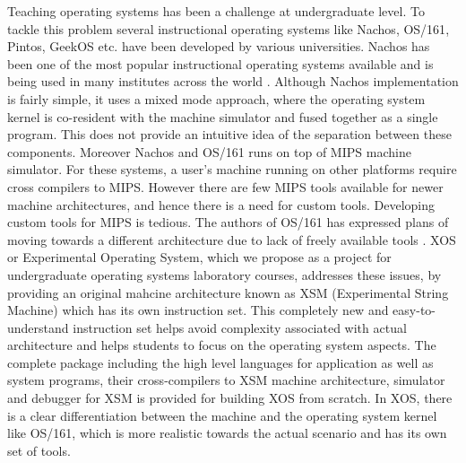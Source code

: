 \documentclass{sig-alternate}
\begin{document}
Teaching operating systems has been a challenge at undergraduate level. To tackle this problem several instructional operating systems like Nachos\cite{nachos}, OS/161\cite{os161}, Pintos\cite{Pintos}, GeekOS\cite{survey} etc. have been developed by various universities. Nachos\cite{nachos} has been one of the most popular instructional operating systems available and is being used in many institutes across the world \cite{survey}. Although Nachos implementation is fairly simple, it uses a mixed mode approach, where the operating system kernel is co-resident with the machine simulator and fused together as a single program. This does not provide an intuitive idea of the separation between these components. Moreover Nachos\cite{nachos} and OS/161\cite{os161} runs on top of MIPS machine simulator. For these systems, a user's machine running on other platforms require cross compilers to MIPS. However there are few MIPS tools available for newer machine architectures, and hence there is a need for custom tools. Developing custom tools for MIPS is tedious. The authors of OS/161 has expressed plans of moving towards a different architecture due to lack of freely available tools \cite{os161}. XOS or Experimental Operating System, which we propose as a project for undergraduate operating systems laboratory courses, addresses these issues, by providing an original mahcine architecture known as XSM (Experimental String Machine) which has its own instruction set. This completely new and easy-to-understand instruction set helps avoid complexity associated with actual architecture and helps students to focus on the operating system aspects. The complete package including the high level languages for application as well as system programs, their cross-compilers to XSM machine architecture, simulator and debugger for XSM is provided for building XOS from scratch. In XOS, there is a clear differentiation between the machine and the operating system kernel like OS/161\cite{os161}, which is more realistic towards the actual scenario and has its own set of tools.\\
\end{document}
